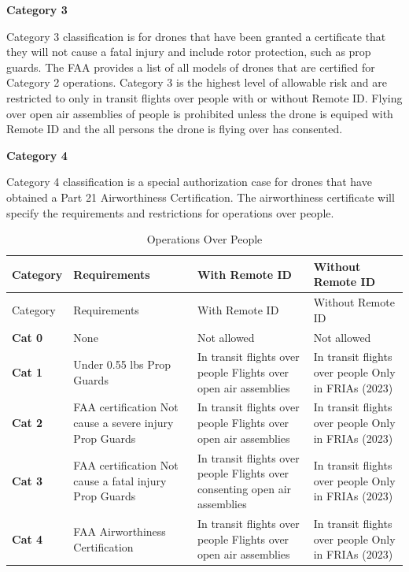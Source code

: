 \documentclass[
  12pt,
]{book}
\begin{document}
\textbf{Category 3}

Category 3 classification is for drones that have been granted a certificate that they will not cause a fatal injury and include rotor protection, such as prop guards. The FAA provides a list of all models of drones that are certified for Category 2 operations. Category 3 is the highest level of allowable risk and are restricted to only in transit flights over people with or without Remote ID. Flying over open air assemblies of people is prohibited unless the drone is equiped with Remote ID and the all persons the drone is flying over has consented.

\textbf{Category 4}

Category 4 classification is a special authorization case for drones that have obtained a Part 21 Airworthiness Certification. The airworthiness certificate will specify the requirements and restrictions for operations over people.

\begin{longtable}[]{@{}
  >{\raggedleft\arraybackslash}p{}
  >{\centering\arraybackslash}p{}
  >{\centering\arraybackslash}p{}
  >{\centering\arraybackslash}p{}@{}}
\caption{\label{tab:OOPS} Operations Over People}\tabularnewline
\toprule
Category & Requirements & With Remote ID & Without Remote ID \\
\midrule
\endfirsthead
\toprule
Category & Requirements & With Remote ID & Without Remote ID \\
\midrule
\endhead
\textbf{Cat 0} & None & Not allowed & Not allowed \\
\textbf{Cat 1} & Under 0.55 lbs Prop Guards & In transit flights over people Flights over open air assemblies & In transit flights over people Only in FRIAs (2023) \\
\textbf{Cat 2} & FAA certification Not cause a severe injury Prop Guards & In transit flights over people Flights over open air assemblies & In transit flights over people Only in FRIAs (2023) \\
\textbf{Cat 3} & FAA certification Not cause a fatal injury Prop Guards & In transit flights over people Flights over consenting open air assemblies & In transit flights over people Only in FRIAs (2023) \\
\textbf{Cat 4} & FAA Airworthiness Certification & In transit flights over people Flights over open air assemblies & In transit flights over people Only in FRIAs (2023) \\
\bottomrule
\end{longtable}
\end{document}
